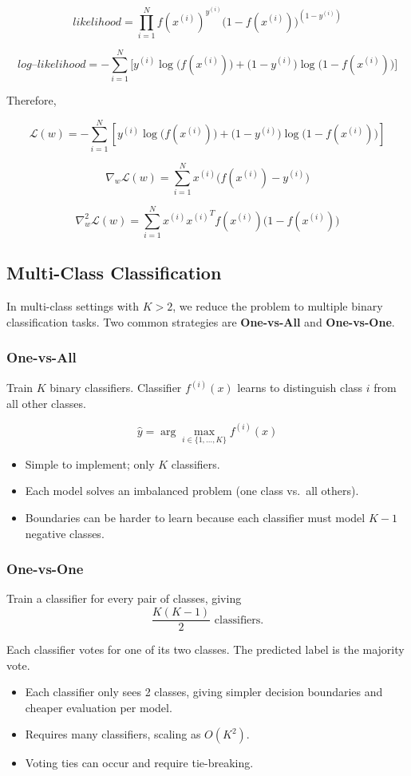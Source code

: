 \documentclass[11pt]{article}
\begin{document}
\[
	likelihood = \prod_{i=1}^N f(x^{(i)})^{y^{(i)}} \big(1 - f(x^{(i)})\big)^{(1 - y^{(i)})}
\]

\[
	log\text{--}likelihood = - \sum_{i=1}^N \Big[ y^{(i)} \log \big(f(x^{(i)})\big)
		+ \big(1 - y^{(i)}\big) \log \big(1 - f(x^{(i)})\big) \Big]
\]

Therefore,

\[
	\mathcal{L}(w) = - \sum_{i=1}^{N} \left[ y^{(i)} \log\!\big(f(x^{(i)})\big) + \big(1 - y^{(i)}\big)\log\!\big(1 - f(x^{(i)})\big) \right]
\]

\[
	\nabla_w \mathcal{L}(w) = \sum_{i=1}^N x^{(i)} \Big(f(x^{(i)}) - y^{(i)}\Big)
\]

\[
	\nabla_w^2 \mathcal{L}(w) = \sum_{i=1}^N x^{(i)} {x^{(i)}}^T f(x^{(i)}) \Big(1 - f(x^{(i)})\Big)
\]

\subsection*{Multi-Class Classification}

In multi-class settings with $K > 2$, we reduce the problem to multiple binary classification tasks. Two common strategies are \textbf{One-vs-All} and \textbf{One-vs-One}.

\subsubsection*{One-vs-All}
Train $K$ binary classifiers.
Classifier $f^{(i)}(x)$ learns to distinguish class $i$ from all other classes.

\[
	\hat{y} = \arg\max_{i \in \{1,\dots,K\}} f^{(i)}(x)
\]

\begin{itemize}
	\item Simple to implement; only $K$ classifiers.
	\item Each model solves an imbalanced problem (one class vs.\ all others).
	\item Boundaries can be harder to learn because each classifier must model $K-1$ negative classes.
\end{itemize}

\subsubsection*{One-vs-One}
Train a classifier for every pair of classes, giving
\[
	\frac{K(K-1)}{2} \text{ classifiers}.
\]

Each classifier votes for one of its two classes.
The predicted label is the majority vote.

\begin{itemize}
	\item Each classifier only sees 2 classes, giving simpler decision boundaries and cheaper evaluation per model.
	\item Requires many classifiers, scaling as $O(K^2)$.
	\item Voting ties can occur and require tie-breaking.
\end{itemize}
\end{document}
